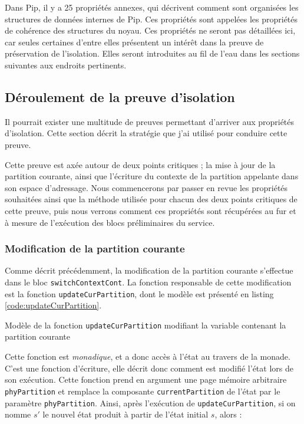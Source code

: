 			Dans Pip, il y a 25 propriétés annexes, qui décrivent comment sont organisées les structures de données internes de Pip. Ces propriétés sont appelées les propriétés de cohérence des structures du noyau. Ces propriétés ne seront pas détaillées ici, car seules certaines d'entre elles présentent un intérêt dans la preuve de préservation de l'isolation. Elles seront introduites au fil de l'eau dans les sections suivantes aux endroits pertinents.

		\subsection{Déroulement de la preuve d'isolation}

		\label{sec:service_proof_establish}

		Il pourrait exister une multitude de preuves permettant d'arriver aux propriétés d'isolation. Cette section décrit la stratégie que j'ai utilisé pour conduire cette preuve.

		Cette preuve est axée autour de deux points critiques ; la mise à jour de la partition courante, ainsi que l'écriture du contexte de la partition appelante dans son espace d'adressage. Nous commencerons par passer en revue les propriétés souhaitées ainsi que la méthode utilisée pour chacun des deux points critiques de cette preuve, puis nous verrons comment ces propriétés sont récupérées au fur et à mesure de l'exécution des blocs préliminaires du service.

			\subsubsection{Modification de la partition courante}
			\label{sec:curPartModif}

			Comme décrit précédemment, la modification de la partition courante s'effectue dans le bloc \texttt{switchContextCont}. La fonction responsable de cette modification est la fonction \texttt{updateCurPartition}, dont le modèle est présenté en listing \ref{code:updateCurPartition}.

			\begin{listing}[!ht]
				\caption{Modèle de la fonction \texttt{updateCurPartition} modifiant la variable contenant la partition courante}
				\label{code:updateCurPartition}
			\end{listing}

			Cette fonction est \emph{monadique}, et a donc accès à l'état au travers de la monade. C'est une fonction d'écriture, elle décrit donc comment est modifié l'état lors de son exécution. Cette fonction prend en argument une page mémoire arbitraire \texttt{phyPartition} et remplace la composante \texttt{currentPartition} de l'état par le paramètre \texttt{phyPartition}. Ainsi, après l'exécution de \texttt{updateCurPartition}, si on nomme $s'$ le nouvel état produit à partir de l'état initial $s$, alors : \\

